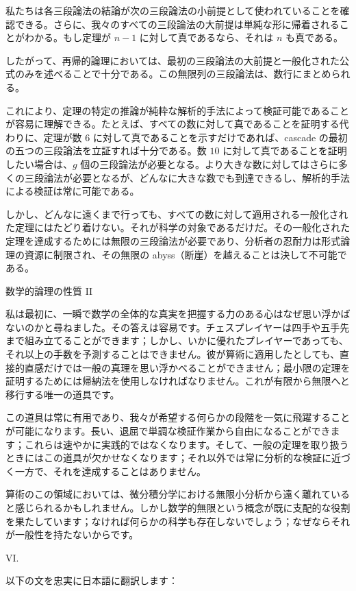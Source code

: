 \documentclass[a4paper,11pt,openany]{ltjsbook}
\begin{document}
私たちは各三段論法の結論が次の三段論法の小前提として使われていることを確認できる。さらに、我々のすべての三段論法の大前提は単純な形に帰着されることがわかる。もし定理が \( n - 1 \) に対して真であるなら、それは \( n \) も真である。

したがって、再帰的論理においては、最初の三段論法の大前提と一般化された公式のみを述べることで十分である。この無限列の三段論法は、数行にまとめられる。

これにより、定理の特定の推論が純粋な解析的手法によって検証可能であることが容易に理解できる。たとえば、すべての数に対して真であることを証明する代わりに、定理が数 \( 6 \) に対して真であることを示すだけであれば、cascade の最初の五つの三段論法を立証すれば十分である。数 \( 10 \) に対して真であることを証明したい場合は、\( g \) 個の三段論法が必要となる。より大きな数に対してはさらに多くの三段論法が必要となるが、どんなに大きな数でも到達できるし、解析的手法による検証は常に可能である。

しかし、どんなに遠くまで行っても、すべての数に対して適用される一般化された定理にはたどり着けない。それが科学の対象であるだけだ。その一般化された定理を達成するためには無限の三段論法が必要であり、分析者の忍耐力は形式論理の資源に制限され、その無限の abyss（断崖）を越えることは決して不可能である。

数学的論理の性質 II

私は最初に、一瞬で数学の全体的な真実を把握する力のある心はなぜ思い浮かばないのかと尋ねました。その答えは容易です。チェスプレイヤーは四手や五手先まで組み立てることができます；しかし、いかに優れたプレイヤーであっても、それ以上の手数を予測することはできません。彼が算術に適用したとしても、直接的直感だけでは一般の真理を思い浮かべることができません；最小限の定理を証明するためには帰納法を使用しなければなりません。これが有限から無限へと移行する唯一の道具です。

この道具は常に有用であり、我々が希望する何らかの段階を一気に飛躍することが可能になります。長い、退屈で単調な検証作業から自由になることができます；これらは速やかに実践的ではなくなります。そして、一般の定理を取り扱うときにはこの道具が欠かせなくなります；それ以外では常に分析的な検証に近づく一方で、それを達成することはありません。

算術のこの領域においては、微分積分学における無限小分析から遠く離れていると感じられるかもしれません。しかし数学的無限という概念が既に支配的な役割を果たしています；なければ何らかの科学も存在しないでしょう；なぜならそれが一般性を持たないからです。

VI.

以下の文を忠実に日本語に翻訳します：
\end{document}
